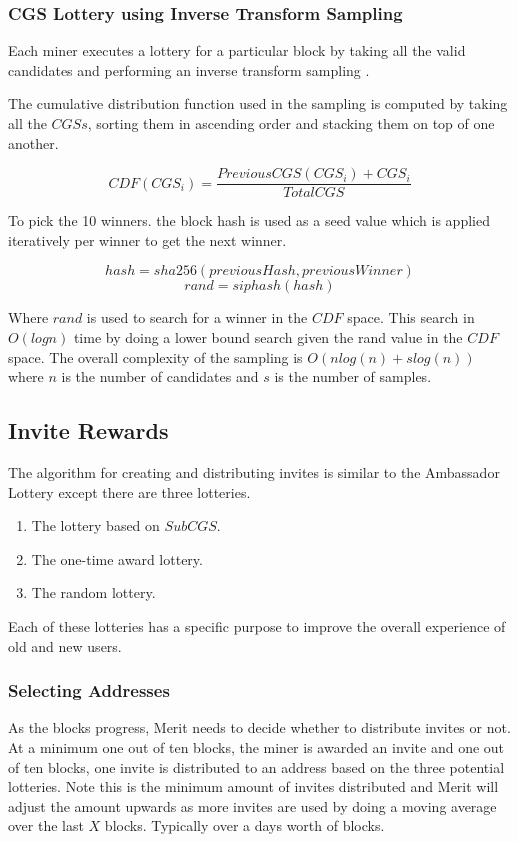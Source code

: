 \documentclass{article}
\begin{document}
\subsubsection{CGS Lottery using Inverse Transform Sampling}

Each miner executes a lottery for a particular block by taking all the valid candidates
and performing an inverse transform sampling \cite{inverse}. 

The cumulative distribution function used in the sampling is computed by taking
all the $CGSs$, sorting them in ascending order and stacking them on top of one another.

$$CDF(CGS_i) = \frac{PreviousCGS(CGS_i) + CGS_i}{TotalCGS}$$

To pick the 10 winners.  the block hash is used as a seed value which is applied
iteratively per winner to get the next winner.

$$hash = sha256(previousHash, previousWinner)$$
$$rand = siphash(hash)$$

Where $rand$ is used to search for a winner in the $CDF$ space.  This search in $O(logn)$
time by doing a lower bound search given the rand value in the $CDF$ space.
The overall complexity of the sampling is $O(nlog(n) + slog(n))$ where $n$ is the number
of candidates and $s$ is the number of samples.

\subsection{Invite Rewards}

The algorithm for creating and distributing invites is similar to the Ambassador
Lottery except there are three lotteries. 

\begin{enumerate}
        \item The lottery based on $SubCGS$.
        \item The one-time award lottery.
        \item The random lottery.
\end{enumerate}

Each of these lotteries has a specific purpose to improve the overall experience
of old and new users.

\subsubsection{Selecting Addresses}

As the blocks progress, Merit needs to decide whether to distribute invites 
or not.  At a minimum one out of ten blocks, the miner is awarded an invite and
one out of ten blocks, one invite is distributed to an address based on the three
potential lotteries.  Note this is the minimum amount of invites distributed and
Merit will adjust the amount upwards as more invites are used by doing a moving
average over the last $X$ blocks.  Typically over a days worth of blocks.
\end{document}
